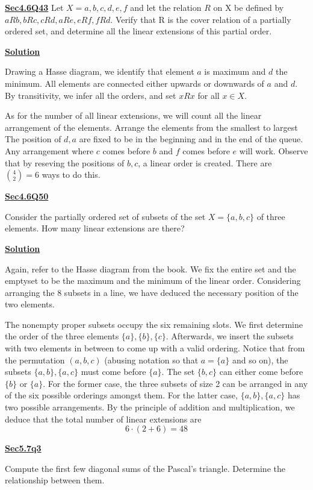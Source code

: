 \documentclass{article}
\newcommand{\new}[1]{
    \vspace{2mm}
    \noindent
    \textbf{
    \underline{#1}}
}
\newcommand{\m}{
    \cdot
}
\begin{document}
\new{Sec4.6Q43} Let $X = {a, b, c, d, e, f}$ and let the relation $R$ on X be defined by $aRb, b R c, 
c R d, aRe, e R f, f R d$. Verify that R is the cover relation of a partially ordered 
set, and determine all the linear extensions of this partial order. 

\new{Solution}
Drawing a Hasse diagram, we identify that element $a$ 
is maximum and $d$ the minimum. All elements are connected
either upwards or downwards of $a$ and $d$. By transitivity, 
we infer all the orders, and set $xRx$ for all $x \in X$. 

As for the number of all linear extensions, we 
will count all the linear arrangement of the elements. 
Arrange the elements from the smallest to largest
The position of $d, a$ are fixed to be in the beginning 
and in the end of the queue. Any arrangement 
where $c$ comes before $b$ and $f$ comes before $e$ 
will work. Observe that by reseving the positions of 
$b, c$, a linear order is created. There are $\boxed{\binom{4}{2} = 6}$ 
ways to do this. 


\new{Sec4.6Q50}
Consider the partially ordered set of subsets of the set $X = \{a, b, c\}$ of 
three elements. How many linear extensions are there? 

\new{Solution}

Again, refer to the Hasse diagram from the book. We fix the 
entire set and the emptyset to be the maximum and the minimum of the linear 
order. Considering arranging the 8 subsets in a line, we have 
deduced the necessary position of the two elements. 

The nonempty proper subsets occupy the six remaining slots. 
We first determine the order of the three elements $\{a\}, \{b\}, \{c\}$. 
Afterwards, we insert the subsets with two elements in between to 
come up with a valid ordering. Notice that from the permutation 
$(a, b, c)$ (abusing notation so that $a = \{a\}$ and so on), the 
subsets $\{a, b\}, \{a, c\}$ must come before $\{a\}$. The set $\{b, c\}$
can either come before $\{b\}$ or $\{a\}$. For the former case, 
the three subsets of size 2 can be arranged in any of the six possible 
orderings amongst them. For the latter case,  $\{a, b\}, \{a, c\}$ 
has two possible arrangements. By the principle of addition and 
multiplication, we deduce that the total number of linear extensions 
are 
\[
    6\m(2+6) = \boxed{48}
\]

\new{Sec5.7q3}
Compute the first few diagonal sums of the Pascal's triangle. 
Determine the relationship between them. 
\end{document}
